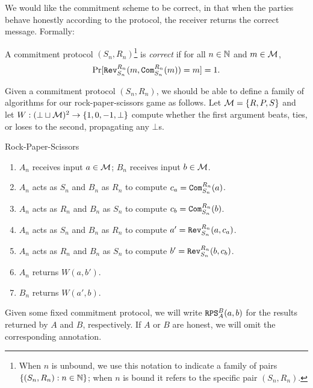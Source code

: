 We would like the commitment scheme to be correct, in that when the parties
behave honestly according to the protocol, the receiver returns the correct
message. Formally:
\begin{dfn}
	A commitment protocol $(S_n,R_n)$\footnote{When $n$ is unbound, we use this
		notation to indicate a family of pairs $\{(S_n,R_n):n\in\mathbb{N}\}$; when $n$ is bound it refers
		to the specific pair $(S_n,R_n)$.} is \emph{correct} if for all $n\in\mathbb{N}$ and
	$m\in\mathcal{M}$, \[
		\Pr[{\texttt{Rev}}_{S_n}^{R_n}(m, {\texttt{Com}}_{S_n}^{R_n}(m)) = m] = 1.
	\]
\end{dfn}

\noindent
Given a commitment protocol $(S_n,R_n)$, we should be able to define a family of
algorithms for our rock-paper-scissors game as follows. Let $\mathcal{M} = \{R,P,S\}$
and let $W: (\bot\sqcup\mathcal{M})^2\rightarrow\{1,0,-1,\bot\}$ compute whether the
first argument beats, ties, or loses to the second, propagating any $\bot$s.

\begin{prot}{Rock-Paper-Scissors}\label{prot:rock-paper-scissors}
	\begin{enumerate}[itemsep=-0.2em]
		\item $A_n$ receives input $a\in\mathcal{M}$; $B_n$ receives input $b\in\mathcal{M}$.
		\item $A_n$ acts as $S_n$ and $B_n$ as $R_n$ to compute $c_a = {\texttt{Com}}_{S_n}^{R_n}(a)$.
		\item $A_n$ acts as $R_n$ and $B_n$ as $S_n$ to compute $c_b = {\texttt{Com}}_{S_n}^{R_n}(b)$.
		\item $A_n$ acts as $S_n$ and $B_n$ as $R_n$ to compute $a' = {\texttt{Rev}}_{S_n}^{R_n}(a,c_a)$.
		\item $A_n$ acts as $R_n$ and $B_n$ as $S_n$ to compute $b' = {\texttt{Rev}}_{S_n}^{R_n}(b,c_b)$.
		\item $A_n$ returns $W(a,b')$.
		\item $B_n$ returns $W(a',b)$.
	\end{enumerate}
\end{prot}

\begin{ntn}
	Given some fixed commitment protocol, we will write
	${\texttt{RPS}}_{A}^{B}(a,b)$ for the results returned by $A$ and $B$,
	respectively. If $A$ or $B$ are honest, we will omit the corresponding
	annotation.
\end{ntn}

